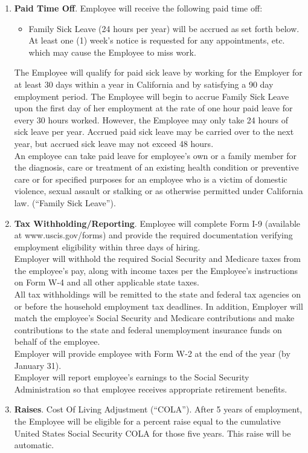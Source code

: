 \documentclass[]{article}
\begin{document}
\begin{enumerate}
	\item{\textbf{Paid Time Off}}. Employee will receive the following paid time off:
		\begin{itemize}
			\item Family Sick Leave (24 hours per year) will be accrued as set forth below. At least one (1) week's notice is requested for any appointments, etc. which may cause the Employee to miss work.
		\end{itemize}
		The Employee will qualify for paid sick leave by working for the Employer for at least 30 days within a year in California and by satisfying a 90 day employment period. The Employee will begin to accrue Family Sick Leave upon the first day of her employment at the rate of one hour paid leave for every 30 hours worked. However, the Employee may only take 24 hours of sick leave per year. Accrued paid sick leave may be carried over to the next year, but accrued sick leave may not exceed 48 hours.\\
	An employee can take paid leave for employee's own or a family member for the diagnosis, care or treatment of an existing health condition or preventive care or for specified purposes for an employee who is a victim of domestic violence, sexual assault or stalking or as otherwise permitted under California law. (``Family Sick Leave'').
	\item{\textbf{Tax Withholding/Reporting}}. Employee will complete Form I-9 (available at www.uscis.gov/forms) and provide the required documentation verifying employment eligibility within three days of hiring.\\
	Employer will withhold the required Social Security and Medicare taxes from the employee's pay, along with income taxes per the Employee's instructions on Form W-4 and all other applicable state taxes.\\
	All tax withholdings will be remitted to the state and federal tax agencies on or before the household employment tax deadlines. In addition, Employer will match the employee's Social Security and Medicare contributions and make contributions to the state and federal unemployment insurance funds on behalf of the employee.\\
	Employer will provide employee with Form W-2 at the end of the year (by January 31).\\
	Employer will report employee's earnings to the Social Security Administration so that employee receives appropriate retirement benefits.
	\item{\textbf{Raises}}. Cost Of Living Adjustment (``COLA''). After 5 years of employment, the Employee will be eligible for a percent raise equal to the cumulative United States Social Security COLA for those five years. This raise will be automatic.
\end{enumerate}
\end{document}
